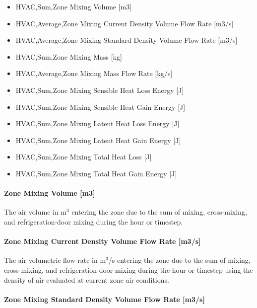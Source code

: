 \begin{itemize}
\item
  HVAC,Sum,Zone Mixing Volume {[}m3{]}
\item
  HVAC,Average,Zone Mixing Current Density Volume Flow Rate {[}m3/s{]}
\item
  HVAC,Average,Zone Mixing Standard Density Volume Flow Rate {[}m3/s{]}
\item
  HVAC,Sum,Zone Mixing Mass {[}kg{]}
\item
  HVAC,Average,Zone Mixing Mass Flow Rate {[}kg/s{]}
\item
  HVAC,Sum,Zone Mixing Sensible Heat Loss Energy {[}J{]}
\item
  HVAC,Sum,Zone Mixing Sensible Heat Gain Energy {[}J{]}
\item
  HVAC,Sum,Zone Mixing Latent Heat Loss Energy {[}J{]}
\item
  HVAC,Sum,Zone Mixing Latent Heat Gain Energy {[}J{]}
\item
  HVAC,Sum,Zone Mixing Total Heat Loss {[}J{]}
\item
  HVAC,Sum,Zone Mixing Total Heat Gain Energy {[}J{]}
\end{itemize}

\paragraph{Zone Mixing Volume {[}m3{]}}\label{zone-mixing-volume-m3}

The air volume in m\(^{3}\) entering the zone due to the sum of mixing, cross-mixing, and refrigeration-door mixing during the hour or timestep.

\paragraph{Zone Mixing Current Density Volume Flow Rate {[}m3/s{]}}\label{zone-mixing-current-density-volumetric-flow-rate-m3s}

The air volumetric flow rate in m\(^{3}\)/s entering the zone due to the sum of mixing, cross-mixing, and refrigeration-door mixing during the hour or timestep using the density of air evaluated at current zone air conditions.

\paragraph{Zone Mixing Standard Density Volume Flow Rate {[}m3/s{]}}\label{zone-mixing-standard-density-volumetric-flow-rate-m3s}

